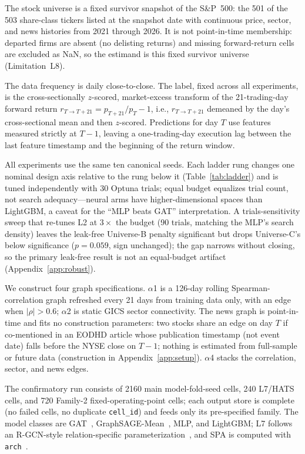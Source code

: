 \documentclass{article}
\begin{document}
The stock universe is a fixed survivor snapshot of the S\&P~500: the 501 of the 503 share-class tickers listed at the snapshot date with continuous price, sector, and news histories from 2021 through 2026. It is not point-in-time membership: departed firms are absent (no delisting returns) and missing forward-return cells are excluded as NaN, so the estimand is this fixed survivor universe (Limitation~L8).

The data frequency is daily close-to-close. The label, fixed across all experiments, is the cross-sectionally $z$-scored, market-excess transform of the 21-trading-day forward return $r_{T\to T+21}=p_{T+21}/p_T-1$, i.e., $r_{T\to T+21}$ demeaned by the day's cross-sectional mean and then $z$-scored. Predictions for day $T$ use features measured strictly at $T{-}1$, leaving a one-trading-day execution lag between the last feature timestamp and the beginning of the return window.

All experiments use the same ten canonical seeds. Each ladder rung changes one nominal design axis relative to the rung below it (Table~\ref{tab:ladder}) and is tuned independently with 30 Optuna trials; equal budget equalizes trial count, not search adequacy---neural arms have higher-dimensional spaces than LightGBM, a caveat for the ``MLP beats GAT'' interpretation. A trials-sensitivity sweep that re-tunes L2 at $3\times$ the budget (90 trials, matching the MLP's search density) leaves the leak-free Universe-B penalty significant but drops Universe-C's below significance ($p=0.059$, sign unchanged); the gap narrows without closing, so the primary leak-free result is not an equal-budget artifact (Appendix~\ref{app:robust}).

We construct four graph specifications. $\alpha$1 is a 126-day rolling Spearman-correlation graph refreshed every 21 days from training data only, with an edge when $|\rho|>0.6$; $\alpha$2 is static GICS sector connectivity. The news graph is point-in-time and fits no construction parameters: two stocks share an edge on day $T$ if co-mentioned in an EODHD article whose publication timestamp (not event date) falls before the NYSE close on $T-1$; nothing is estimated from full-sample or future data (construction in Appendix~\ref{app:setup}). $\alpha$4 stacks the correlation, sector, and news edges.

The confirmatory run consists of 2160 main model-fold-seed cells, 240 L7/HATS cells, and 720 Family-2 fixed-operating-point cells; each output store is complete (no failed cells, no duplicate \texttt{cell\_id}) and feeds only its pre-specified family. The model classes are GAT~\citep{velickovic2018gat}, GraphSAGE-Mean~\citep{hamilton2017graphsage}, MLP, and LightGBM; L7 follows an R-GCN-style relation-specific parameterization~\citep{schlichtkrull2018rgcn}, and SPA is computed with \texttt{arch}~\citep{sheppard_arch}.
\end{document}
